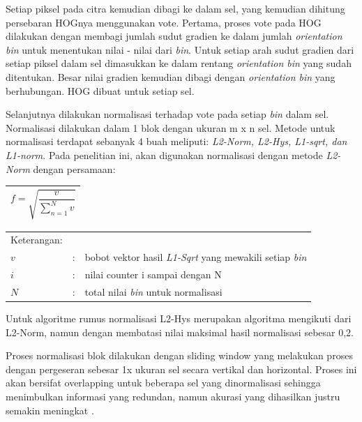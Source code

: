 Setiap piksel pada citra kemudian dibagi ke dalam sel, yang kemudian dihitung persebaran HOGnya menggunakan vote. Pertama, proses vote pada HOG dilakukan dengan membagi jumlah sudut gradien ke dalam jumlah \textit{orientation bin} untuk menentukan nilai - nilai dari \textit{bin}. Untuk setiap arah sudut gradien dari setiap piksel dalam sel dimasukkan ke dalam rentang \textit{orientation bin} yang sudah ditentukan. Besar nilai gradien kemudian dibagi dengan \textit{orientation bin} yang berhubungan. HOG dibuat untuk setiap sel.

Selanjutnya dilakukan normalisasi terhadap vote pada setiap \textit{bin} dalam sel. Normalisasi dilakukan dalam 1 blok dengan ukuran m x n sel. Metode untuk normalisasi terdapat sebanyak 4 buah meliputi: \textit{L2-Norm, L2-Hys, L1-sqrt, dan L1-norm}. Pada penelitian ini, akan digunakan normalisasi dengan metode \textit{L2-Norm} dengan persamaan:

\begin{table}[H]
	\small
	\begin{adjustbox}{width=1\textwidth}
		\begin{tabular}{|p{13.55cm}|}
			\hline
			\begin{equation} \label{eqn:normalisasi2}
			\displaystyle
			f =\sqrt{ \frac{v}{\sum\limits_{n=1}^{N} v}}
			\end{equation} \\
			\hline
		\end{tabular}
	\end{adjustbox}
\end{table}

\noindent
\renewcommand{\arraystretch}{1}
\begin{tabularx}{\textwidth}{lll}
	\hline
	Keterangan: \\
	$v$ & : & bobot vektor hasil \textit{L1-Sqrt} yang mewakili setiap \textit{bin}\\
	$i$ & : & nilai counter i sampai dengan N\\
	$N$ & : & total nilai \textit{bin} untuk normalisasi\\
	\hline
\end{tabularx}
\vspace{4.5pt}

Untuk algoritme rumus normalisasi L2-Hys merupakan algoritma mengikuti dari L2-Norm, namun dengan membatasi nilai maksimal hasil normalisasi sebesar 0,2.

Proses normalisasi blok dilakukan dengan sliding window yang melakukan proses dengan pergeseran sebesar 1x ukuran sel secara vertikal dan horizontal. Proses ini akan bersifat overlapping untuk beberapa sel yang dinormalisasi sehingga menimbulkan informasi yang redundan, namun akurasi yang dihasilkan justru semakin meningkat \cite{opencv}.
\\

